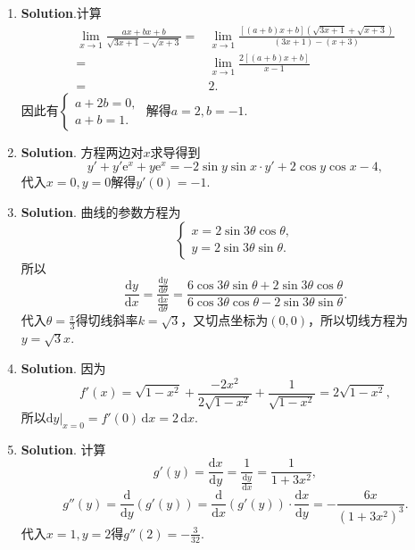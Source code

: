 \documentclass[../main.tex]{subfiles}
\begin{document}
\begin{enumerate}
    \item \textbf{Solution}.计算
          \[
              \begin{aligned}
                  \lim_{x\to1}\frac{ax+bx+b}{\sqrt{3x+1}-\sqrt{x+3}}= {} & \lim_{x\to1}\frac{[(a+b)x+b]\left(\sqrt{3x+1}+\sqrt{x+3}\right)}{(3x+1)-(x+3)} \\
                  = {}                                                   & \lim_{x\to1}\frac{2[(a+b)x+b]}{x-1}                                            \\
                  = {}                                                   & 2.
              \end{aligned}
          \]
          因此有$\begin{cases}
                  a+2b=0, \\
                  a+b=1.
              \end{cases}$ 解得$a=2,b=-1$.

    \item \textbf{Solution}. 方程两边对$x$求导得到
          \[
              y'+y'\mathrm{e}^{x}+y\mathrm{e}^{x}=-2\sin y\sin x\cdot y'+2\cos y\cos x-
              4,
          \]
          代入$x=0,y=0$解得$y'(0)=-1$.

    \item \textbf{Solution}. 曲线的参数方程为
          \[
              \begin{cases}
                  x=2\sin3\theta\cos\theta, \\
                  y=2\sin3\theta\sin\theta.
              \end{cases}
          \]
          所以
          \[
              \frac{\mathrm{d}y}{\mathrm{d}x}=\frac{\frac{\mathrm{d}y}{\mathrm{d}\theta}}{\frac{\mathrm{d}x}{\mathrm{d}\theta}}
              =\frac{6\cos3\theta\sin\theta+2\sin3\theta\cos\theta}{6\cos3\theta\cos\theta-2\sin3\theta\sin\theta}.
          \]
          代入$\theta=\frac{\pi}{3}$得切线斜率$k=\sqrt{3}$，又切点坐标为$(0,0)$，所以切线方程为$y
              =\sqrt{3}x$.

    \item \textbf{Solution}. 因为
          \[
              f'(x)=\sqrt{1-x^{2}}+\frac{-2x^{2}}{2\sqrt{1-x^{2}}}
              +\frac{1}{\sqrt{1-x^{2}}}=2\sqrt{1-x^{2}},
          \]
          所以$\left.\mathrm{d}y\right|_{x=0}=f'(0)\,\mathrm{d}x=2\,\mathrm{d}x$.

    \item \textbf{Solution}. 计算
          \[
              g'(y)=\frac{\mathrm{d}x}{\mathrm{d}y}=\frac{1}{\frac{\mathrm{d}y}{\mathrm{d}x}}
              =\frac{1}{1+3x^{2}},
          \]
          \[
              g''(y)=\frac{\mathrm{d}}{\mathrm{d}y}\left(g'(y)\right)=\frac{\mathrm{d}}{\mathrm{d}x}
              \left(g'(y)\right)\cdot\frac{\mathrm{d}x}{\mathrm{d}y}=-\frac{6x}{(1+3x^{2})^{3}}.
          \]
          代入$x=1,y=2$得$g''(2)=-\frac{3}{32}$.


\end{enumerate}
\end{document}

